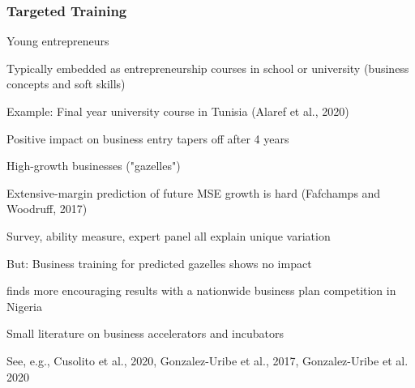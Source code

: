 \documentclass[hideothersubsections, usenames,dvipsnames,11pt]{beamer}
\newenvironment{itemize_2pt}{\itemize\addtolength{\itemsep}{2pt}}{\enditemize}
\begin{document}
\begin{frame}
\frametitle{Targeted Training}
	Young entrepreneurs
	\begin{itemize_2pt}
		\item Typically embedded as \textcolor{bdf}{entrepreneurship courses in school or university} (business concepts and soft skills)
		\item Example: Final year university course in Tunisia \textcolor{camel}{(Alaref et al., 2020)}
		\begin{itemize_2pt}
			\item Positive impact on business entry tapers off after 4 years
		\end{itemize_2pt}
	\end{itemize_2pt}
	
\pause

\vspace{1.0em}

High-growth businesses ("gazelles")
\begin{itemize_2pt}
	\item Extensive-margin prediction of future MSE growth is hard \textcolor{camel}{(Fafchamps and Woodruff, 2017)} 
	\begin{itemize_2pt}
		\item Survey, ability measure, expert panel all explain unique variation
		\item But: Business training for predicted gazelles shows no impact
	\end{itemize_2pt} 
	
	\item \citet{McKenzie2017a} finds more encouraging results with a nationwide business plan competition in Nigeria
	
	\item Small literature on business accelerators and incubators
	\begin{itemize_2pt}
		\item See, e.g., \textcolor{camel}{Cusolito et al., 2020}, \textcolor{camel}{Gonzalez-Uribe et al., 2017}, \textcolor{camel}{Gonzalez-Uribe et al. 2020}
	\end{itemize_2pt}
\end{itemize_2pt}
	
\end{frame}

\end{document}
